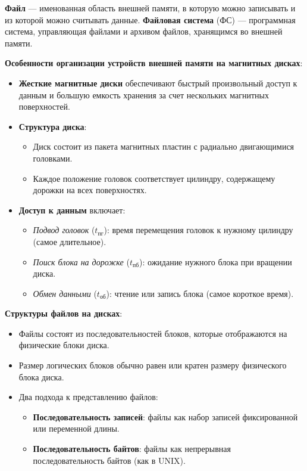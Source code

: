 \documentclass[a4paper,12pt]{article}
\begin{document}
\textbf{Файл} — именованная область внешней памяти, в которую можно записывать и из которой можно считывать данные. \textbf{Файловая система} (ФС) — программная система, управляющая файлами и архивом файлов, хранящимся во внешней памяти.

\textbf{Особенности организации устройств внешней памяти на магнитных дисках}:

\begin{itemize}
    \item \textbf{Жесткие магнитные диски} обеспечивают быстрый произвольный доступ к данным и большую емкость хранения за счет нескольких магнитных поверхностей.
    \item \textbf{Структура диска}:
    \begin{itemize}
        \item Диск состоит из пакета магнитных пластин с радиально двигающимися головками.
        \item Каждое положение головок соответствует цилиндру, содержащему дорожки на всех поверхностях.
    \end{itemize}
    \item \textbf{Доступ к данным} включает:
    \begin{itemize}
        \item \textit{Подвод головок} ($t_{\text{пг}}$): время перемещения головок к нужному цилиндру (самое длительное).
        \item \textit{Поиск блока на дорожке} ($t_{\text{пб}}$): ожидание нужного блока при вращении диска.
        \item \textit{Обмен данными} ($t_{\text{об}}$): чтение или запись блока (самое короткое время).
    \end{itemize}
\end{itemize}

\textbf{Структуры файлов на дисках}:

\begin{itemize}
    \item Файлы состоят из последовательностей блоков, которые отображаются на физические блоки диска.
    \item Размер логических блоков обычно равен или кратен размеру физического блока диска.
    \item Два подхода к представлению файлов:
    \begin{itemize}
        \item \textbf{Последовательность записей}: файлы как набор записей фиксированной или переменной длины.
        \item \textbf{Последовательность байтов}: файлы как непрерывная последовательность байтов (как в UNIX).
    \end{itemize}
\end{itemize}
\end{document}

